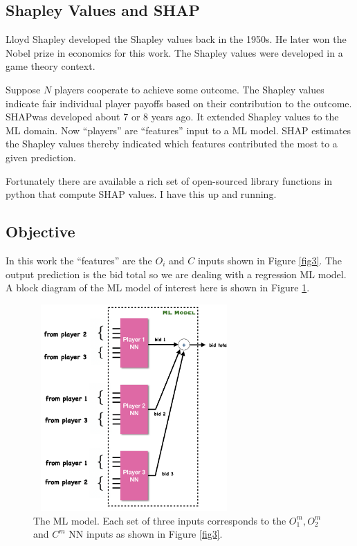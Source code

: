 \documentclass{article}   	%
\begin{document}
\subsection{Shapley Values and SHAP}

Lloyd Shapley developed the Shapley values back in the 1950s. He later won the Nobel prize in economics for this work. The Shapley values were developed in a game theory context. 

Suppose $N$ players cooperate to achieve some outcome. The Shapley values indicate fair individual player payoffs based on their contribution to the outcome. SHAP\footnotemark was developed about 7 or 8 years ago. It extended Shapley values to the ML domain. Now ``players'' are ``features'' input to a ML model. SHAP estimates the Shapley values thereby indicated which features contributed the most to a given prediction.


Fortunately there are available a rich set of open-sourced library functions in python that compute SHAP values. I have this up and running.


\subsection{Objective}


In this work the ``features'' are the $O_i$ and $C$ inputs shown in Figure \ref{fig3}. The output prediction is the bid total so we are dealing with a regression ML model. A block diagram of the ML model of interest here is shown in Figure \ref{fig6}.

\begin{figure}[htb]
\centerline{\includegraphics[width=7.7cm,height=7.9cm]{amy}}
\caption{The ML model. Each set of three inputs corresponds to the $O_1^{m}, O_2^{m}$ and $C^m$ NN inputs as shown in Figure \ref{fig3}.}
\label{fig6}
\end{figure}
\end{document}

